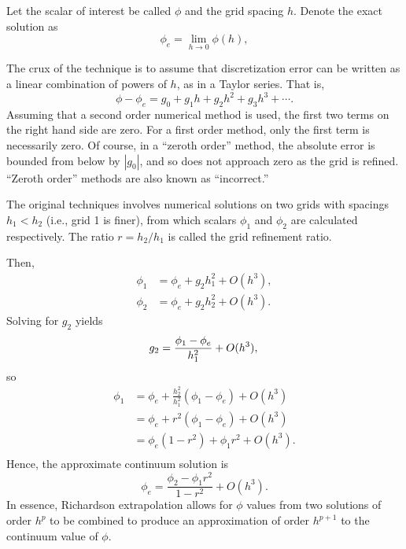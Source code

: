 Let the scalar of interest be called $\phi$ and the grid spacing $h$.
Denote the exact solution as
\begin{equation}
  \phi_e = \lim_{h \to 0} \phi(h),
\end{equation}

The crux of the technique is to assume that discretization error can be written as a linear combination of powers of $h$, as in a Taylor series.
That is,
\begin{equation}
  \phi - \phi_e = g_0 + g_1 h + g_2 h^2 + g_3 h^3 + \cdots.
\end{equation}
Assuming that a second order numerical method is used, the first two terms on the right hand side are zero.
For a first order method, only the first term is necessarily zero.
Of course, in a ``zeroth order'' method, the absolute error is bounded from below by $|g_0|$, and so does not approach zero as the grid is refined.
``Zeroth order'' methods are also known as ``incorrect.''

The original techniques involves numerical solutions on two grids with spacings $h_1 < h_2$ (i.e., grid 1 is finer), from which scalars $\phi_1$ and $\phi_2$ are calculated respectively.
The ratio $r = h_2/h_1$ is called the grid refinement ratio.

Then,
\begin{align*}
  \phi_1 &= \phi_e + g_2 h_1^2 + O(h^3), \\
  \phi_2 &= \phi_e + g_2 h_2^2 + O(h^3).
\end{align*}
Solving for $g_2$ yields
\begin{equation*}
  g_2 = \frac{\phi_1 - \phi_e}{h_1^2} + O(h^3), \\
\end{equation*}
so
\begin{align*}
  \phi_1 &= \phi_e + \frac{h_2^2}{h_1^2}(\phi_1 - \phi_e) + O(h^3) \\
  &=  \phi_e + r^2(\phi_1 - \phi_e) + O(h^3) \\
  &= \phi_e(1-r^2) + \phi_1 r^2 + O(h^3). \\
\end{align*}
Hence, the approximate continuum solution is
\begin{equation*}
  \phi_e = \frac{\phi_2 - \phi_1 r^2}{1 - r^2} + O(h^3).
\end{equation*}
In essence, Richardson extrapolation allows for $\phi$ values from two solutions of order $h^p$ to be combined to produce an approximation of order $h^{p+1}$ to the continuum value of $\phi$.

